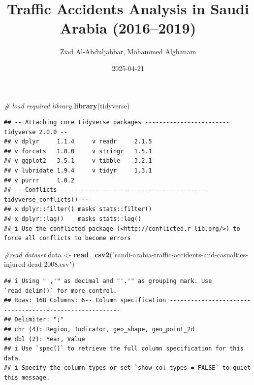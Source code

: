 \documentclass[
]{article}
\title{Traffic Accidents Analysis in Saudi Arabia (2016--2019)}
\author{Ziad Al-Abduljabbar, Mohammed Alghanam}
\date{2025-04-21}
\newenvironment{Shaded}{\begin{snugshade}}{\end{snugshade}}
\newcommand{\CommentTok}[1]{\textcolor[rgb]{0.56,0.35,0.01}{\textit{#1}}}
\newcommand{\FunctionTok}[1]{\textcolor[rgb]{0.13,0.29,0.53}{\textbf{#1}}}
\newcommand{\NormalTok}[1]{#1}
\newcommand{\OtherTok}[1]{\textcolor[rgb]{0.56,0.35,0.01}{#1}}
\newcommand{\StringTok}[1]{\textcolor[rgb]{0.31,0.60,0.02}{#1}}
\begin{document}
\maketitle

\begin{Shaded}
\begin{Highlighting}[]
\CommentTok{\# load required library }
\FunctionTok{library}\NormalTok{(tidyverse)}
\end{Highlighting}
\end{Shaded}

\begin{verbatim}
## -- Attaching core tidyverse packages ------------------------ tidyverse 2.0.0 --
## v dplyr     1.1.4     v readr     2.1.5
## v forcats   1.0.0     v stringr   1.5.1
## v ggplot2   3.5.1     v tibble    3.2.1
## v lubridate 1.9.4     v tidyr     1.3.1
## v purrr     1.0.2     
## -- Conflicts ------------------------------------------ tidyverse_conflicts() --
## x dplyr::filter() masks stats::filter()
## x dplyr::lag()    masks stats::lag()
## i Use the conflicted package (<http://conflicted.r-lib.org/>) to force all conflicts to become errors
\end{verbatim}

\begin{Shaded}
\begin{Highlighting}[]
\CommentTok{\#read dataset}
\NormalTok{data }\OtherTok{\textless{}{-}} \FunctionTok{read\_csv2}\NormalTok{(}\StringTok{"saudi{-}arabia{-}traffic{-}accidents{-}and{-}casualties{-}injured{-}dead{-}2008.csv"}\NormalTok{)}
\end{Highlighting}
\end{Shaded}

\begin{verbatim}
## i Using "','" as decimal and "'.'" as grouping mark. Use `read_delim()` for more control.
## Rows: 168 Columns: 6-- Column specification --------------------------------------------------------
## Delimiter: ";"
## chr (4): Region, Indicator, geo_shape, geo_point_2d
## dbl (2): Year, Value
## i Use `spec()` to retrieve the full column specification for this data.
## i Specify the column types or set `show_col_types = FALSE` to quiet this message.
\end{verbatim}
\end{document}

